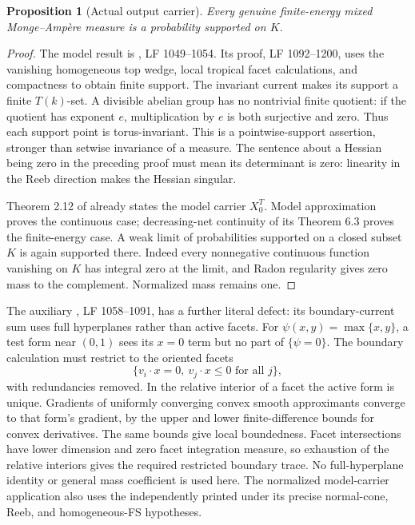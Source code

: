 \documentclass[11pt]{article}
\newtheorem{proposition}{Proposition}
\theoremstyle{remark}
\begin{document}
\begin{proposition}[Actual output carrier]
Every genuine finite-energy mixed Monge--Amp\`ere measure is a probability supported on $K$.
\end{proposition}
\begin{proof}
The model result is \cite[Corollary 5.7]{Wu21}, LF 1049--1054. Its proof, LF 1092--1200, uses the vanishing homogeneous top wedge, local tropical facet calculations, and compactness to obtain finite support. The invariant current makes its support a finite $T(k)$-set. A divisible abelian group has no nontrivial finite quotient: if the quotient has exponent $e$, multiplication by $e$ is both surjective and zero. Thus each support point is torus-invariant. This is a pointwise-support assertion, stronger than setwise invariance of a measure. The sentence about a Hessian being zero in the preceding proof must mean its determinant is zero: linearity in the Reeb direction makes the Hessian singular.

Theorem 2.12 of \cite{Wu24} already states the model carrier $X_0^T$. Model approximation proves the continuous case; decreasing-net continuity of its Theorem 6.3 proves the finite-energy case. A weak limit of probabilities supported on a closed subset $K$ is again supported there. Indeed every nonnegative continuous function vanishing on $K$ has integral zero at the limit, and Radon regularity gives zero mass to the complement. Normalized mass remains one.
\end{proof}

The auxiliary \cite[Lemma 5.8]{Wu21}, LF 1058--1091, has a further literal defect: its boundary-current sum uses full hyperplanes rather than active facets. For $\psi(x,y)=\max\{x,y\}$, a test form near $(0,1)$ sees its $x=0$ term but no part of $\{\psi=0\}$. The boundary calculation must restrict to the oriented facets
\[
 \{v_i\cdot x=0,\ v_j\cdot x\le0\text{ for all }j\},
\]
with redundancies removed. In the relative interior of a facet the active form is unique. Gradients of uniformly converging convex smooth approximants converge to that form's gradient, by the upper and lower finite-difference bounds for convex derivatives. The same bounds give local boundedness. Facet intersections have lower dimension and zero facet integration measure, so exhaustion of the relative interiors gives the required restricted boundary trace. No full-hyperplane identity or general mass coefficient is used here. The normalized model-carrier application also uses the independently printed \cite[Theorem 2.12]{Wu24} under its precise normal-cone, Reeb, and homogeneous-FS hypotheses.
\end{document}
